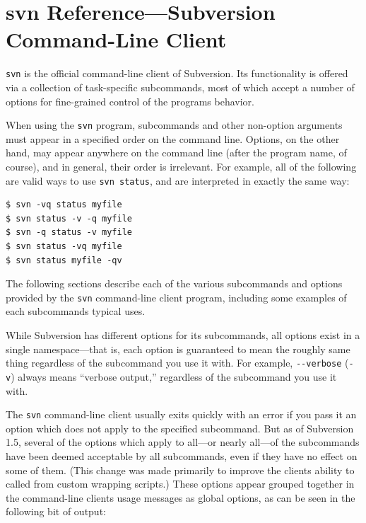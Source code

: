 \chapter{svn Reference---Subversion Command-Line
Client}\label{svn.ref.svn}

\texttt{svn} is the official command-line client of Subversion. Its
functionality is offered via a collection of task-specific subcommands,
most of which accept a number of options for fine-grained control of the
program\textquotesingle s behavior.

When using the \texttt{svn} program, subcommands and other non-option
arguments must appear in a specified order on the command line. Options,
on the other hand, may appear anywhere on the command line (after the
program name, of course), and in general, their order is irrelevant. For
example, all of the following are valid ways to use
\texttt{svn\ status}, and are interpreted in exactly the same way:

\begin{verbatim}
$ svn -vq status myfile
$ svn status -v -q myfile
$ svn -q status -v myfile
$ svn status -vq myfile
$ svn status myfile -qv
\end{verbatim}

The following sections describe each of the various subcommands and
options provided by the \texttt{svn} command-line client program,
including some examples of each subcommand\textquotesingle s typical
uses.

While Subversion has different options for its subcommands, all options
exist in a single namespace---that is, each option is guaranteed to mean
the roughly same thing regardless of the subcommand you use it with. For
example, \texttt{-\/-verbose} (\texttt{-v}) always means ``verbose
output,'' regardless of the subcommand you use it with.

The \texttt{svn} command-line client usually exits quickly with an error
if you pass it an option which does not apply to the specified
subcommand. But as of Subversion 1.5, several of the options which apply
to all---or nearly all---of the subcommands have been deemed acceptable
by all subcommands, even if they have no effect on some of them. (This
change was made primarily to improve the client\textquotesingle s
ability to called from custom wrapping scripts.) These options appear
grouped together in the command-line client\textquotesingle s usage
messages as global options, as can be seen in the following bit of
output:

